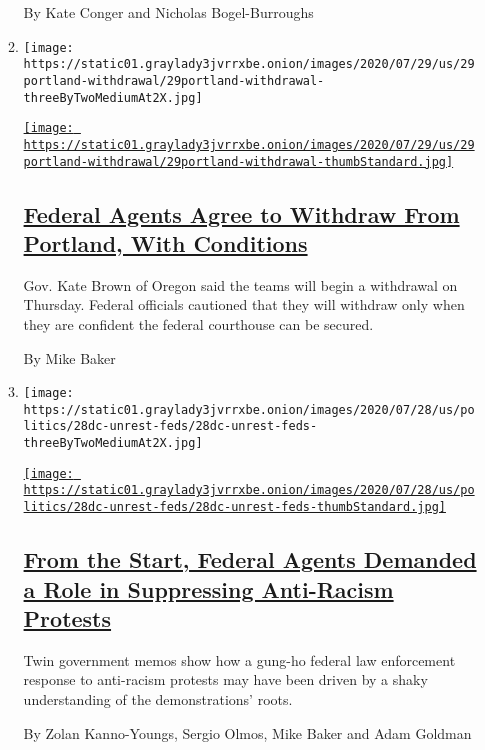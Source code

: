 \begin{enumerate}
\begin{enumerate}
    By Kate Conger and Nicholas Bogel-Burroughs
  \item
    \texttt{[image: https://static01.graylady3jvrrxbe.onion/images/2020/07/29/us/29portland-withdrawal/29portland-withdrawal-threeByTwoMediumAt2X.jpg]}

    \href{/2020/07/29/us/protests-portland-federal-withdrawal.html}{\texttt{[image: https://static01.graylady3jvrrxbe.onion/images/2020/07/29/us/29portland-withdrawal/29portland-withdrawal-thumbStandard.jpg]}}

    \hypertarget{federal-agents-agree-to-withdraw-from-portland-with-conditions}{%
    \subsection{\texorpdfstring{\href{/2020/07/29/us/protests-portland-federal-withdrawal.html}{Federal
    Agents Agree to Withdraw From Portland, With
    Conditions}}{Federal Agents Agree to Withdraw From Portland, With Conditions}}\label{federal-agents-agree-to-withdraw-from-portland-with-conditions}}

    Gov. Kate Brown of Oregon said the teams will begin a withdrawal on
    Thursday. Federal officials cautioned that they will withdraw only
    when they are confident the federal courthouse can be secured.

    By Mike Baker
  \item
    \texttt{[image: https://static01.graylady3jvrrxbe.onion/images/2020/07/28/us/politics/28dc-unrest-feds/28dc-unrest-feds-threeByTwoMediumAt2X.jpg]}

    \href{/2020/07/28/us/federal-agents-portland-seattle-protests.html}{\texttt{[image: https://static01.graylady3jvrrxbe.onion/images/2020/07/28/us/politics/28dc-unrest-feds/28dc-unrest-feds-thumbStandard.jpg]}}

    \hypertarget{from-the-start-federal-agents-demanded-a-role-in-suppressing-anti-racism-protests}{%
    \subsection{\texorpdfstring{\href{/2020/07/28/us/federal-agents-portland-seattle-protests.html}{From
    the Start, Federal Agents Demanded a Role in Suppressing Anti-Racism
    Protests}}{From the Start, Federal Agents Demanded a Role in Suppressing Anti-Racism Protests}}\label{from-the-start-federal-agents-demanded-a-role-in-suppressing-anti-racism-protests}}

    Twin government memos show how a gung-ho federal law enforcement
    response to anti-racism protests may have been driven by a shaky
    understanding of the demonstrations' roots.

    By Zolan Kanno-Youngs, Sergio Olmos, Mike Baker and Adam Goldman
  \end{enumerate}
\end{enumerate}

